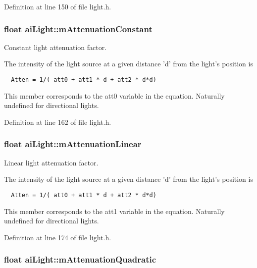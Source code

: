 Definition at line 150 of file light.h.\hypertarget{structai_light_e8804b3c309527ca0f85d676bab55710}{
\subsubsection[mAttenuationConstant]{\setlength{\rightskip}{0pt plus 5cm}float {\bf aiLight::mAttenuationConstant}}}
\label{structai_light_e8804b3c309527ca0f85d676bab55710}


Constant light attenuation factor.

The intensity of the light source at a given distance 'd' from the light's position is 

\begin{Code}\begin{verbatim}  Atten = 1/( att0 + att1 * d + att2 * d*d)
\end{verbatim}
\end{Code}

 This member corresponds to the att0 variable in the equation. Naturally undefined for directional lights. 

Definition at line 162 of file light.h.\hypertarget{structai_light_efda311eaa785ea345782dfa95be817c}{
\subsubsection[mAttenuationLinear]{\setlength{\rightskip}{0pt plus 5cm}float {\bf aiLight::mAttenuationLinear}}}
\label{structai_light_efda311eaa785ea345782dfa95be817c}


Linear light attenuation factor.

The intensity of the light source at a given distance 'd' from the light's position is 

\begin{Code}\begin{verbatim}  Atten = 1/( att0 + att1 * d + att2 * d*d)
\end{verbatim}
\end{Code}

 This member corresponds to the att1 variable in the equation. Naturally undefined for directional lights. 

Definition at line 174 of file light.h.\hypertarget{structai_light_b4fb07bfa40a807661b1ed1791838a6d}{
\subsubsection[mAttenuationQuadratic]{\setlength{\rightskip}{0pt plus 5cm}float {\bf aiLight::mAttenuationQuadratic}}}
\label{structai_light_b4fb07bfa40a807661b1ed1791838a6d}


